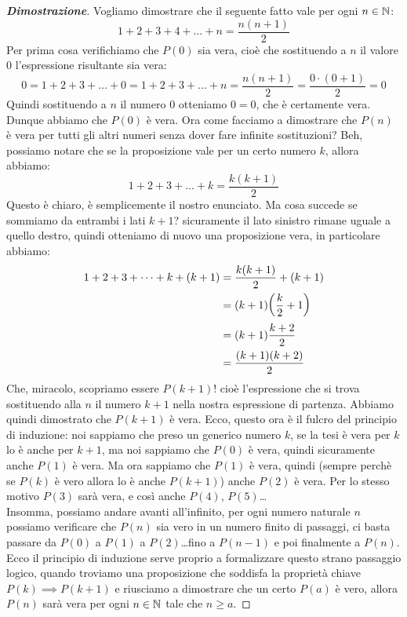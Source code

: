 \documentclass[11pt]{scrartcl}
\begin{document}
	\begin{proof}[\textbf{Dimostrazione}]
		Vogliamo dimostrare che il seguente fatto vale per ogni $n\in\mathbb N$:
		$$1+2+3+4+\dots+n=\frac{n(n+1)}{2}$$
		Per prima cosa verifichiamo che $P(0)$ sia vera, cioè che sostituendo a $n$ il valore $0$ l'espressione risultante sia vera:
		$$0=1+2+3+\dots+0=1+2+3+\dots+n=\frac{n(n+1)}{2}=\frac{0\cdot(0+1)}{2}=0$$
		Quindi sostituendo a $n$ il numero $0$ otteniamo $0=0$, che è certamente vera. Dunque abbiamo che $P(0)$ è vera.
		Ora come facciamo a dimostrare che $P(n)$ è vera per tutti gli altri numeri senza dover fare infinite sostituzioni? Beh, possiamo notare che se la proposizione vale per un certo numero $k$, allora abbiamo:
		$$1+2+3+\dots+k=\frac{k(k+1)}{2}$$
		Questo è chiaro, è semplicemente il nostro enunciato. Ma cosa succede se sommiamo da entrambi i lati $k+1$? sicuramente il lato sinistro rimane uguale a quello destro, quindi otteniamo di nuovo una proposizione vera, in particolare abbiamo:
		\begin{equation}\notag
			\begin{split}
				1+2+3+\dots+k+(k+1) & = \frac{k(k+1)}{2}+(k+1) \\
				& = (k+1)\bigg(\frac{k}{2}+1\bigg) \\
				& = (k+1)\frac{k+2}{2} \\
				& = \frac{(k+1)(k+2)}{2}
			\end{split}
		\end{equation}
		Che, miracolo, scopriamo essere $P(k+1)$! cioè l'espressione che si trova sostituendo alla $n$ il numero $k+1$ nella nostra espressione di partenza. Abbiamo quindi dimostrato che $P(k+1)$ è vera. Ecco, questo ora è il fulcro del principio di induzione: noi sappiamo che preso un generico numero $k$, se la tesi è vera per $k$ lo è anche per $k+1$, ma noi sappiamo che $P(0)$ è vera, quindi sicuramente anche $P(1)$ è vera. Ma ora sappiamo che $P(1)$ è vera, quindi (sempre perchè se $P(k)$ è vero allora lo è anche $P(k+1)$) anche $P(2)$ è vera. Per lo stesso motivo $P(3)$ sarà vera, e così anche $P(4)$, $P(5)$\dots
		\\
		Insomma, possiamo andare avanti all'infinito, per ogni numero naturale $n$ possiamo verificare che $P(n)$ sia vero in un numero finito di passaggi, ci basta passare da $P(0)$ a $P(1)$ a $P(2)$\dots fino a $P(n-1)$ e poi finalmente a $P(n)$.\\
		Ecco il principio di induzione serve proprio a formalizzare questo strano passaggio logico, quando troviamo una proposizione che soddisfa la proprietà chiave $P(k)\implies P(k+1)$ e riusciamo a dimostrare che un certo $P(a)$ è vero, allora $P(n)$ sarà vera per ogni $n\in\mathbb N$ tale che $n\ge a$.

\end{proof}
\end{document}
